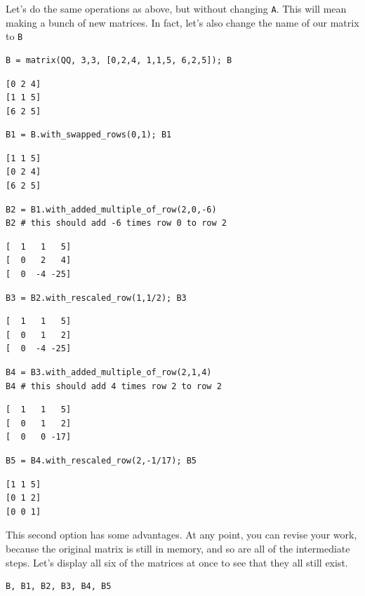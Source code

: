 \documentclass[10pt,]{book}
\theoremstyle{plain}
\numberwithin{equation}{section}
\begin{document}
        Let's do the same operations as above, but without changing \verb?A?.
        This will mean making a bunch of new matrices. In fact, let's also change
        the name of our matrix to \verb?B?
\begin{lstlisting}[style=sageinput]
B = matrix(QQ, 3,3, [0,2,4, 1,1,5, 6,2,5]); B
\end{lstlisting}
\begin{lstlisting}[style=sageoutput]
[0 2 4]
[1 1 5]
[6 2 5]
\end{lstlisting}
\begin{lstlisting}[style=sageinput]
B1 = B.with_swapped_rows(0,1); B1
\end{lstlisting}
\begin{lstlisting}[style=sageoutput]
[1 1 5]
[0 2 4]
[6 2 5]
\end{lstlisting}
\begin{lstlisting}[style=sageinput]
B2 = B1.with_added_multiple_of_row(2,0,-6)
B2 # this should add -6 times row 0 to row 2
\end{lstlisting}
\begin{lstlisting}[style=sageoutput]
[  1   1   5]
[  0   2   4]
[  0  -4 -25]
\end{lstlisting}
\begin{lstlisting}[style=sageinput]
B3 = B2.with_rescaled_row(1,1/2); B3
\end{lstlisting}
\begin{lstlisting}[style=sageoutput]
[  1   1   5]
[  0   1   2]
[  0  -4 -25]
\end{lstlisting}
\begin{lstlisting}[style=sageinput]
B4 = B3.with_added_multiple_of_row(2,1,4)
B4 # this should add 4 times row 2 to row 2
\end{lstlisting}
\begin{lstlisting}[style=sageoutput]
[  1   1   5]
[  0   1   2]
[  0   0 -17]
\end{lstlisting}
\begin{lstlisting}[style=sageinput]
B5 = B4.with_rescaled_row(2,-1/17); B5
\end{lstlisting}
\begin{lstlisting}[style=sageoutput]
[1 1 5]
[0 1 2]
[0 0 1]
\end{lstlisting}
\par

        This second option has some advantages. At any point, you can revise your
        work, because the original matrix is still in memory, and so are all of
        the intermediate steps. Let's display all six of the matrices at once to
        see that they all still exist.
\begin{lstlisting}[style=sageinput]
B, B1, B2, B3, B4, B5
\end{lstlisting}
\typeout{************************************************}
\typeout{************************************************}
\end{document}
